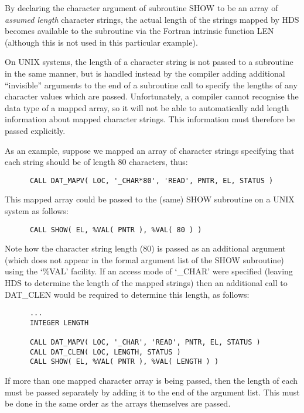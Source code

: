 By declaring the character argument of subroutine SHOW to be an array of {\em
assumed length} character strings, the actual length of the strings mapped by
HDS becomes available to the subroutine via the Fortran intrinsic function LEN
(although this is not used in this particular example).

On UNIX systems, the length of a character string is not passed to a subroutine
in the same manner, but is handled instead by the compiler adding additional
``invisible'' arguments to the end of a subroutine call to specify the lengths
of any character values which are passed. Unfortunately, a compiler cannot
recognise the data type of a mapped array, so it will not be able to
automatically add length information about mapped character strings. This
information must therefore be passed explicitly.

As an example, suppose we mapped an array of character strings specifying that
each string should be of length 80 characters, thus:

\small
\begin{verbatim}
      CALL DAT_MAPV( LOC, '_CHAR*80', 'READ', PNTR, EL, STATUS )
\end{verbatim}
\normalsize

This mapped array could be passed to the (same) SHOW subroutine on a UNIX
system as follows:

\small
\begin{verbatim}
      CALL SHOW( EL, %VAL( PNTR ), %VAL( 80 ) )
\end{verbatim}
\normalsize

Note how the character string length (80) is passed as an additional argument
(which does not appear in the formal argument list of the SHOW subroutine)
using the `\%VAL' facility. If an access mode of `\_CHAR' were specified
(leaving HDS to determine the length of the mapped strings) then an additional
call to DAT\_CLEN would be required to determine this length, as follows:

\small
\begin{verbatim}
      ...
      INTEGER LENGTH

      CALL DAT_MAPV( LOC, '_CHAR', 'READ', PNTR, EL, STATUS )
      CALL DAT_CLEN( LOC, LENGTH, STATUS )
      CALL SHOW( EL, %VAL( PNTR ), %VAL( LENGTH ) )
\end{verbatim}
\normalsize

If more than one mapped character array is being passed, then the length of
each must be passed separately by adding it to the end of the argument list.
This must be done in the same order as the arrays themselves are passed. 

